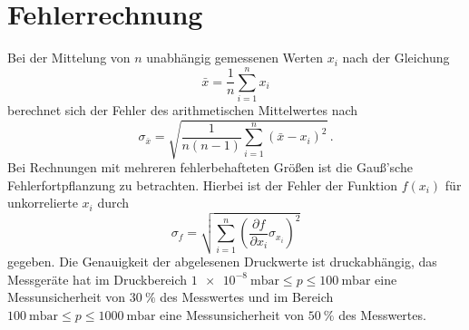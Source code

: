 \section{Fehlerrechnung}
\label{sec:fehler}

\noindent Bei der Mittelung von $n$ unabhängig gemessenen Werten $x_i$ nach der Gleichung 
\begin{equation*}
    \bar{x} = \frac{1}{n} \sum_{i=1}^n x_i
\end{equation*}
berechnet sich der Fehler des arithmetischen Mittelwertes nach
\begin{equation*}
    \sigma_{\bar{x}} = \sqrt{\frac{1}{n(n-1)}\sum_{i=1}^n \left( \bar{x} - x_i \right)^2}\, .
\end{equation*} 
Bei Rechnungen mit mehreren fehlerbehafteten Größen ist die Gauß'sche Fehlerfortpflanzung zu betrachten. Hierbei ist der Fehler der Funktion $f(x_i)$ 
für unkorrelierte $x_i$  durch
\begin{equation}
    \sigma_f = \sqrt{\sum_{i=1}^n \left(\frac{\partial f}{\partial x_i} \sigma_{x_i}\right)^2}
    \label{eqn:gauss}
\end{equation}
gegeben.
Die Genauigkeit der abgelesenen Druckwerte ist druckabhängig, das Messgeräte hat im Druckbereich $ \SI{1e-8}{\milli\bar} \leq p \leq \SI{100}{\milli\bar}$ eine Messunsicherheit von 
$\SI{30}{\percent}$ des Messwertes und im Bereich $\SI{100}{\milli\bar} \leq p \leq \SI{1000}{\milli\bar}$ eine Messunsicherheit von $\SI{50}{\percent}$ des Messwertes. 

